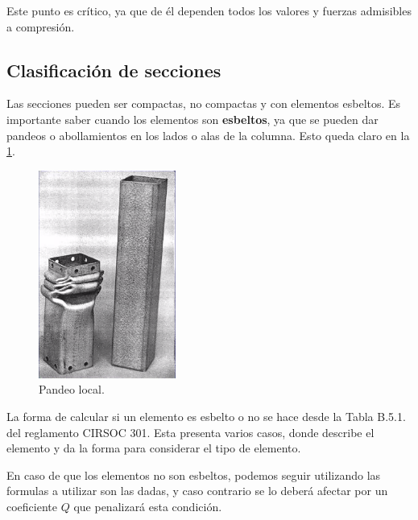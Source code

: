 \documentclass[../main.tex]{subfiles}
\begin{document}
Este punto es crítico, ya que de él dependen todos los valores y fuerzas admisibles 
a compresión.

\subsection{Clasificación de secciones}
Las secciones pueden ser compactas, no compactas y con elementos esbeltos.
Es importante saber cuando los elementos son \textbf{esbeltos}, ya que se pueden
dar pandeos o abollamientos en los lados o alas de la columna. Esto queda claro
en la \cref{fig:abollamiento}.

\begin{figure}[ht]
  \centering
  \includegraphics[width=0.4\textwidth]{../images/20210419/abollamiento}
  \caption{Pandeo local.}
  \label{fig:abollamiento}
\end{figure}  

La forma de calcular si un elemento es esbelto o no se hace desde la Tabla B.5.1.
del reglamento CIRSOC 301. Esta presenta varios casos, donde describe el elemento
y da la forma para considerar el tipo de elemento. 

En caso de que los elementos no son esbeltos, podemos seguir utilizando las
formulas a utilizar son las dadas, y caso contrario se lo deberá afectar por un
coeficiente $Q$ que penalizará esta condición.
\end{document}
